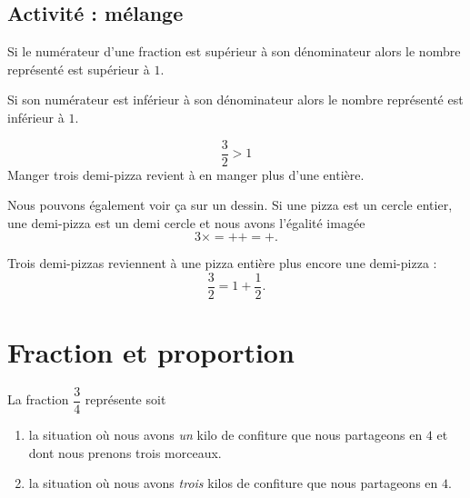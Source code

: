 \subsection*{Activité : mélange}



\begin{Aretenir}
Si le numérateur d'une fraction est supérieur à son dénominateur alors le nombre représenté est supérieur à $1$.

Si son numérateur est inférieur à son dénominateur alors le nombre représenté est inférieur à $1$.
\end{Aretenir}

\begin{example}
    \begin{equation}
        \frac{ 3 }{ 2 }>1
    \end{equation}
    Manger trois demi-pizza revient à en manger plus d'une entière.

    Nous pouvons également voir ça sur un dessin. Si une pizza est un cercle entier, une demi-pizza est un demi cercle et nous avons l'égalité imagée
    \begin{equation}
        3\times =++=+.
    \end{equation}

    Trois demi-pizzas reviennent à une pizza entière plus encore une demi-pizza :
    \begin{equation}
        \frac{ 3 }{ 2 }=1+\frac{ 1 }{ 2 }.
    \end{equation}
\end{example}


\section{Fraction et proportion}

\begin{example}
    La fraction \( \dfrac{ 3 }{ 4 }\) représente soit
    \begin{enumerate}
        \item
            la situation où nous avons \emph{un} kilo de confiture que nous partageons en \( 4\) et dont nous prenons trois morceaux.
        \item
            la situation où nous avons \emph{trois} kilos de confiture que nous partageons en \( 4\).
    \end{enumerate}
\end{example}

